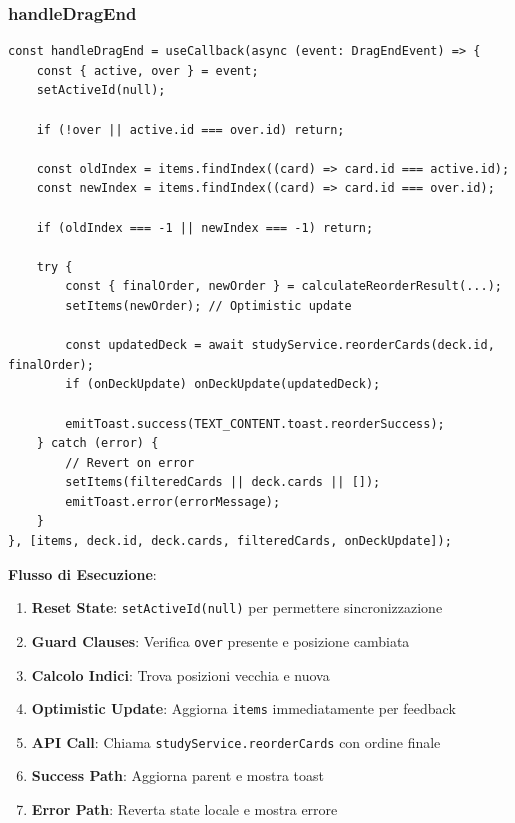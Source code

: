 \documentclass[11pt,a4paper]{article}
\begin{document}
\subsubsection{handleDragEnd}

\begin{lstlisting}[style=typescript, caption=Handler Fine Drag]
const handleDragEnd = useCallback(async (event: DragEndEvent) => {
    const { active, over } = event;
    setActiveId(null);
    
    if (!over || active.id === over.id) return;
    
    const oldIndex = items.findIndex((card) => card.id === active.id);
    const newIndex = items.findIndex((card) => card.id === over.id);
    
    if (oldIndex === -1 || newIndex === -1) return;
    
    try {
        const { finalOrder, newOrder } = calculateReorderResult(...);
        setItems(newOrder); // Optimistic update
        
        const updatedDeck = await studyService.reorderCards(deck.id, finalOrder);
        if (onDeckUpdate) onDeckUpdate(updatedDeck);
        
        emitToast.success(TEXT_CONTENT.toast.reorderSuccess);
    } catch (error) {
        // Revert on error
        setItems(filteredCards || deck.cards || []);
        emitToast.error(errorMessage);
    }
}, [items, deck.id, deck.cards, filteredCards, onDeckUpdate]);
\end{lstlisting}

\textbf{Flusso di Esecuzione}:
\begin{enumerate}
    \item \textbf{Reset State}: \texttt{setActiveId(null)} per permettere sincronizzazione
    \item \textbf{Guard Clauses}: Verifica \texttt{over} presente e posizione cambiata
    \item \textbf{Calcolo Indici}: Trova posizioni vecchia e nuova
    \item \textbf{Optimistic Update}: Aggiorna \texttt{items} immediatamente per feedback
    \item \textbf{API Call}: Chiama \texttt{studyService.reorderCards} con ordine finale
    \item \textbf{Success Path}: Aggiorna parent e mostra toast
    \item \textbf{Error Path}: Reverta state locale e mostra errore
\end{enumerate}
\end{document}
